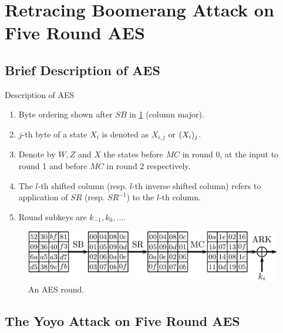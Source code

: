 \documentclass[notheorems]{beamer}
\theoremstyle{definition}
\theoremstyle{example}
\begin{document}
    \section[Application to Five Round AES]{Retracing Boomerang Attack on Five Round AES}
    \label{sec:retr-boomerang-aes}

    \subsection{Brief Description of AES}
    \label{subsec:aes-description}

    \begin{frame}{Description of AES}
        \begin{enumerate}[<+->]
            \item Byte ordering shown after \(SB\) in \cref{fig:aes} (column
            major).
            \item \(j\)-th byte of a state \(X_i\) is denoted as \(X_{i,j}\) or
            \((X_i)_j\).
            \item Denote by \(W, Z\) and \(X\) the states before \(MC\) in round
            0, at the input to round 1 and before \(MC\) in round 2
            respectively.
            \item The \(l\)-th shifted column (resp. \(l\)-th inverse shifted
            column) refers to application of \(SR\) (resp. \(SR^{-1}\)) to the
            \(l\)-th column.
            \item Round subkeys are \(k_{-1}, k_0, \ldots\).
        \end{enumerate}
        \begin{figure}[!ht]
            \centering
            \includegraphics[width=0.85\columnwidth]{images/aes.png}
            \caption{An AES round.}
            \label{fig:aes}
        \end{figure}
    \end{frame}

    \subsection{The Yoyo Attack on Five Round AES}
    \label{subsec:yoyo-aes}
\end{document}
